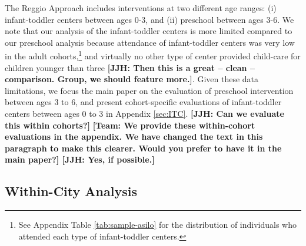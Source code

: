 The Reggio Approach includes interventions at two different age ranges: (i) infant-toddler centers between ages 0-3, and (ii) preschool between ages 3-6. We note that our analysis of the infant-toddler centers is more limited compared to our preschool analysis because attendance of infant-toddler centers was very low in the adult cohorts,\footnote{See Appendix Table \ref{tab:sample-asilo} for the distribution of individuals who attended each type of infant-toddler centers.} and virtually no other type of center provided child-care for children younger than three \textbf{[JJH: Then this is a great -- clean -- comparison. Group, we should feature more.]}. Given these data limitations, we focus the main paper on the evaluation of preschool intervention between ages 3 to 6, and present cohort-specific evaluations of  infant-toddler centers between ages 0 to 3 in Appendix \ref{sec:ITC}. \textbf{[JJH: Can we evaluate this within cohorts?]} \textbf{[Team: We provide these within-cohort evaluations in the appendix. We have changed the text in this paragraph to make this clearer. Would you prefer to have it in the main paper?] [JJH: Yes, if possible.]}


\subsection{Within-City Analysis} \label{sec:within-city-analysis}

